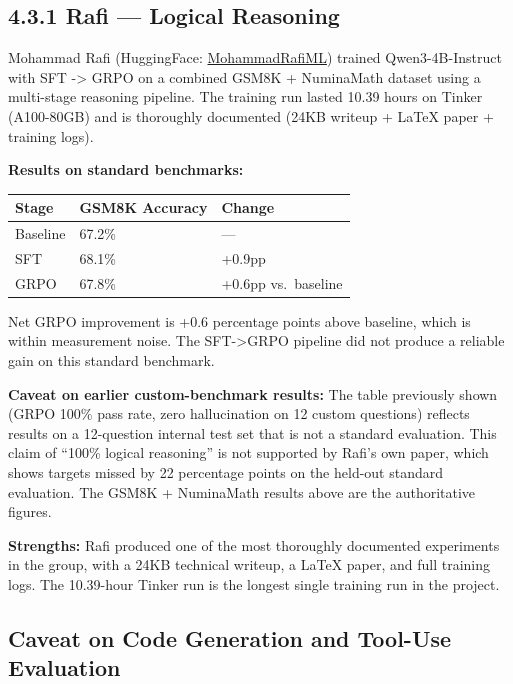 \documentclass[
  american,
  11pt,
  a4paper,
  oneside]{report}
\newcounter{none} %
\begin{document}
\subsection{4.3.1 Rafi --- Logical
Reasoning}\label{rafi-logical-reasoning}

Mohammad Rafi (HuggingFace:
\href{https://huggingface.co/MohammadRafiML}{MohammadRafiML}) trained
Qwen3-4B-Instruct with SFT -\textgreater{} GRPO on a combined GSM8K +
NuminaMath dataset using a multi-stage reasoning pipeline. The training
run lasted 10.39 hours on Tinker (A100-80GB) and is thoroughly
documented (24KB writeup + LaTeX paper + training logs).

\textbf{Results on standard benchmarks:}

{\def\LTcaptype{none} %
\begin{longtable}[]{@{}lll@{}}
\toprule\noalign{}
Stage & GSM8K Accuracy & Change \\
\midrule\noalign{}
\endhead
\bottomrule\noalign{}
\endlastfoot
Baseline & 67.2\% & --- \\
SFT & 68.1\% & +0.9pp \\
GRPO & 67.8\% & +0.6pp vs.~baseline \\
\end{longtable}
}

Net GRPO improvement is +0.6 percentage points above baseline, which is
within measurement noise. The SFT-\textgreater GRPO pipeline did not
produce a reliable gain on this standard benchmark.

\textbf{Caveat on earlier custom-benchmark results:} The table
previously shown (GRPO 100\% pass rate, zero hallucination on 12 custom
questions) reflects results on a 12-question internal test set that is
not a standard evaluation. This claim of ``100\% logical reasoning'' is
not supported by Rafi's own paper, which shows targets missed by 22
percentage points on the held-out standard evaluation. The GSM8K +
NuminaMath results above are the authoritative figures.

\textbf{Strengths:} Rafi produced one of the most thoroughly documented
experiments in the group, with a 24KB technical writeup, a LaTeX paper,
and full training logs. The 10.39-hour Tinker run is the longest single
training run in the project.

\subsection{Caveat on Code Generation and Tool-Use
Evaluation}\label{caveat-on-code-generation-and-tool-use-evaluation}
\end{document}
